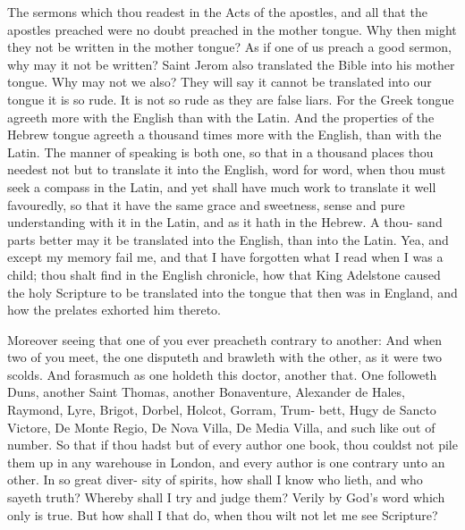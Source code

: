 \documentclass{custom}
\begin{document}
The sermons which thou readest in the Acts 
of the apostles, and all that the apostles preached 
were no doubt preached in the mother tongue. 
Why then might they not be written in the 
mother tongue? As if one of us preach a good 
sermon, why may it not be written? Saint 
Jerom also translated the Bible into his mother 
tongue. Why may not we also? They will say 
it cannot be translated into our tongue it is so 
rude. It is not so rude as they are false liars.
For the Greek tongue agreeth more with the 
English than with the Latin. And the properties 
of the Hebrew tongue agreeth a thousand times 
more with the English, than with the Latin. The 
manner of speaking is both one, so that in a 
thousand places thou needest not but to translate 
it into the English, word for word, when thou 
must seek a compass in the Latin, and yet shall
have much work to translate it well favouredly, 
so that it have the same grace and sweetness,
sense and pure understanding with it in the 
Latin, and as it hath in the Hebrew. A thou- 
sand parts better may it be translated into the 
English, than into the Latin. Yea, and except 
my memory fail me, and that I have forgotten 
what I read when I was a child; thou shalt find in 
the English chronicle, how that King Adelstone
caused the holy Scripture to be translated into
the tongue that then was in England, and how 
the prelates exhorted him thereto. 

Moreover seeing that one of you ever preacheth 
contrary to another: And when two of you 
meet, the one disputeth and brawleth with the 
other, as it were two scolds. And forasmuch 
as one holdeth this doctor, another that. One 
followeth Duns, another Saint Thomas, another
Bonaventure, Alexander de Hales, Raymond, 
Lyre, Brigot, Dorbel, Holcot, Gorram, Trum- 
bett, Hugy de Sancto Victore, De Monte Regio, 
De Nova Villa, De Media Villa, and such like out 
of number. So that if thou hadst but of every 
author one book, thou couldst not pile them up 
in any warehouse in London, and every author 
is one contrary unto an other. In so great diver- 
sity of spirits, how shall I know who lieth, and 
who sayeth truth? Whereby shall I try and 
judge them? Verily by God's word which 
only is true. But how shall I that do, when thou 
wilt not let me see Scripture? 
\end{document}
